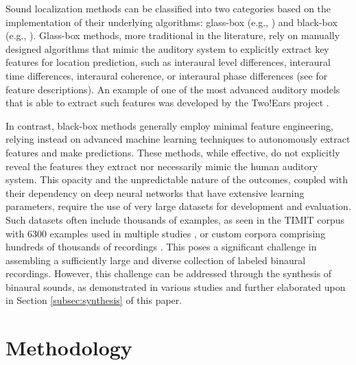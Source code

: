 \documentclass{article}
\begin{document}
Sound localization methods can be classified into two categories based on the implementation of their underlying algorithms: glass-box (e.g., \cite{dietz_auditory_2011, may_probabilistic_2011, may_binaural_2012, may_robust_2015, woodruff_binaural_2012, ma16c_interspeech, ma_exploiting_2017, ma_robust_2018}) and black-box (e.g., \cite{vecchiotti19, vera-diaz_towards_2018, yang_deepear_2022}). Glass-box methods, more traditional in the literature, rely on manually designed algorithms that mimic the auditory system to explicitly extract key features for location prediction, such as interaural level differences, interaural time differences, interaural coherence, or interaural phase differences (see \cite{blauert_spatial_1996} for feature descriptions). An example of one of the most advanced auditory models that is able to extract such features was developed by the Two!Ears project \cite{raake_computational_nodate}.

In contrast, black-box methods generally employ minimal feature engineering, relying instead on advanced machine learning techniques to autonomously extract features and make predictions. These methods, while effective, do not explicitly reveal the features they extract nor necessarily mimic the human auditory system. This opacity and the unpredictable nature of the outcomes, coupled with their dependency on deep neural networks that have extensive learning parameters, require the use of very large datasets for development and evaluation. Such datasets often include thousands of examples, as seen in the TIMIT corpus with 6300 examples \cite{garofolo_john_s_timit_1993} used in multiple studies \cite{yang_deepear_2022, benaroya_binaural_2018, wang_binaural_2020, vecchiotti19, ma_exploiting_2017, pang_multitask_2019, ma_robust_2018, may_robust_2015}, or custom corpora comprising hundreds of thousands of recordings \cite{antoniuk2023blind, zielinski_automatic_2022, zielinski_spatial_2022, zielinski_comparison_2020}. This poses a significant challenge in assembling a sufficiently large and diverse collection of labeled binaural recordings. However, this challenge can be addressed through the synthesis of binaural sounds, as demonstrated in various studies \cite{antoniuk2023blind, zielinski_automatic_2022, zielinski_spatial_2022, zielinski_comparison_2020,yang_deepear_2022, ma_robust_2018} and further elaborated upon in Section \ref{subsec:synthesis} of this paper.

\section{Methodology}
\label{sec:methodology}
\end{document}
